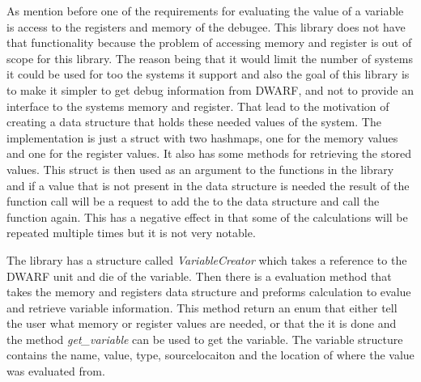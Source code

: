 As mention before one of the requirements for evaluating the value of a variable is access to the registers and memory of the debugee.
This library does not have that functionality because the problem of accessing memory and register is out of scope for this library.
The reason being that it would limit the number of systems it could be used for too the systems it support and also the goal of this library is to make it simpler to get debug information from \gls{DWARF}, and not to provide an interface to the systems memory and register.
That lead to the motivation of creating a data structure that holds these needed values of the system.
The implementation is just a struct with two hashmaps, one for the memory values and one for the register values.
It also has some methods for retrieving the stored values.
This struct is then used as an argument to the functions in the library and if a value that is not present in the data structure is needed the result of the function call will be a request to add the to the data structure and call the function again.
This has a negative effect in that some of the calculations will be repeated multiple times but it is not very notable.


The library has a structure called \emph{VariableCreator} which  takes a reference to the \gls{DWARF} unit and die of the variable.
Then there is a evaluation method that takes the memory and registers data structure and preforms calculation to evalue and retrieve variable information.
This method return an enum that either tell the user what memory or register values are needed, or that the it is done and the method \emph{get\_variable} can be used to get the variable.
The variable structure contains the name, value, type, sourcelocaiton and the location of where the value was evaluated from.


